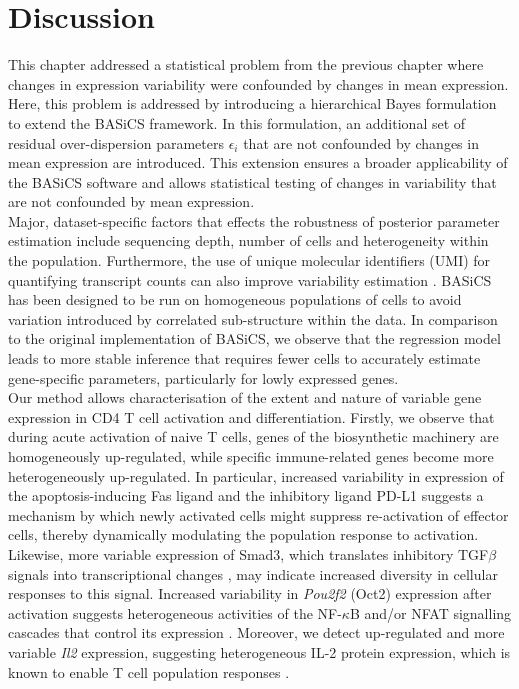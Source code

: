 
\section{Discussion}

This chapter addressed a statistical problem from the previous chapter where changes in expression variability were confounded by changes in mean expression. Here, this problem is addressed by introducing a hierarchical Bayes formulation to extend the BASiCS framework. In this formulation, an additional set of residual over-dispersion parameters $\epsilon_i$ that are not confounded by changes in mean expression are introduced. This extension ensures a broader applicability of the BASiCS software and allows statistical testing of changes in variability that are not confounded by mean expression.  \\ 

Major, dataset-specific factors that effects the robustness of posterior parameter estimation include sequencing depth, number of cells and heterogeneity within the population. Furthermore, the use of unique molecular identifiers (UMI) for quantifying transcript counts can also improve variability estimation \citep{Grun2014}. BASiCS has been designed to be run on homogeneous populations of cells to avoid variation introduced by correlated sub-structure within the data. In comparison to the original implementation of BASiCS, we observe that the regression model leads to more stable inference that requires fewer cells to accurately estimate gene-specific parameters, particularly for lowly expressed genes. \\

Our method allows characterisation of the extent and nature of variable gene expression in CD4\plus{} T cell activation and differentiation. Firstly, we observe that during acute activation of naive T cells, genes of the biosynthetic machinery are homogeneously up-regulated, while specific immune-related genes become more heterogeneously up-regulated. In particular, increased variability in expression of the apoptosis-inducing Fas ligand \citep{Strasser2009} and the inhibitory ligand PD-L1 \citep{Chikuma2016} suggests a mechanism by which newly activated cells might suppress re-activation of effector cells, thereby dynamically modulating the population response to activation. Likewise, more variable expression of Smad3, which translates inhibitory TGF$\beta$ signals into transcriptional changes \citep{Delisle2013}, may indicate increased diversity in cellular responses to this signal. Increased variability in \textit{Pou2f2} (Oct2) expression after activation suggests heterogeneous activities of the NF-$\kappa$B and/or NFAT signalling cascades that control its expression \citep{Mueller2013}.
Moreover, we detect up-regulated and more variable \textit{Il2} expression, suggesting heterogeneous IL-2 protein expression, which is known to enable T cell population responses \citep{Fuhrmann2016}. 


